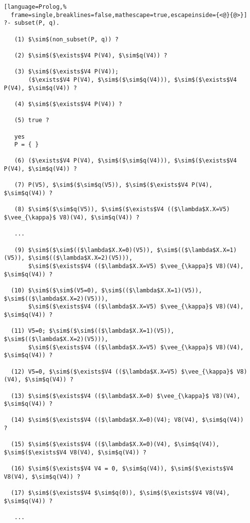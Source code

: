 \documentclass[inscr,ack,preface]{dithesis}
\theoremstyle{definition}
\begin{document}
\begin{lstlisting}[language=Prolog,%
  frame=single,breaklines=false,mathescape=true,escapeinside={<@}{@>}]
?- subset(P, q).

   (1) $\sim$(non_subset(P, q)) ?

   (2) $\sim$($\exists$V4 P(V4), $\sim$q(V4)) ?

   (3) $\sim$($\exists$V4 P(V4));
       ($\exists$V4 P(V4), $\sim$($\sim$q(V4))), $\sim$($\exists$V4 P(V4), $\sim$q(V4)) ?

   (4) $\sim$($\exists$V4 P(V4)) ?

   (5) true ?

   yes
   P = { }

   (6) ($\exists$V4 P(V4), $\sim$($\sim$q(V4))), $\sim$($\exists$V4 P(V4), $\sim$q(V4)) ?

   (7) P(V5), $\sim$($\sim$q(V5)), $\sim$($\exists$V4 P(V4), $\sim$q(V4)) ?

   (8) $\sim$($\sim$q(V5)), $\sim$($\exists$V4 (($\lambda$X.X=V5) $\vee_{\kappa}$ V8)(V4), $\sim$q(V4)) ?

   ...

   (9) $\sim$($\sim$(($\lambda$X.X=0)(V5)), $\sim$(($\lambda$X.X=1)(V5)), $\sim$(($\lambda$X.X=2)(V5))),
       $\sim$($\exists$V4 (($\lambda$X.X=V5) $\vee_{\kappa}$ V8)(V4), $\sim$q(V4)) ?

  (10) $\sim$($\sim$(V5=0), $\sim$(($\lambda$X.X=1)(V5)), $\sim$(($\lambda$X.X=2)(V5))),
       $\sim$($\exists$V4 (($\lambda$X.X=V5) $\vee_{\kappa}$ V8)(V4), $\sim$q(V4)) ?

  (11) V5=0; $\sim$($\sim$(($\lambda$X.X=1)(V5)), $\sim$(($\lambda$X.X=2)(V5))),
       $\sim$($\exists$V4 (($\lambda$X.X=V5) $\vee_{\kappa}$ V8)(V4), $\sim$q(V4)) ?

  (12) V5=0, $\sim$($\exists$V4 (($\lambda$X.X=V5) $\vee_{\kappa}$ V8)(V4), $\sim$q(V4)) ?

  (13) $\sim$($\exists$V4 (($\lambda$X.X=0) $\vee_{\kappa}$ V8)(V4), $\sim$q(V4)) ?

  (14) $\sim$($\exists$V4 (($\lambda$X.X=0)(V4); V8(V4), $\sim$q(V4)) ?

  (15) $\sim$($\exists$V4 (($\lambda$X.X=0)(V4), $\sim$q(V4)), $\sim$($\exists$V4 V8(V4), $\sim$q(V4)) ?

  (16) $\sim$($\exists$V4 V4 = 0, $\sim$q(V4)), $\sim$($\exists$V4 V8(V4), $\sim$q(V4)) ?

  (17) $\sim$($\exists$V4 $\sim$q(0)), $\sim$($\exists$V4 V8(V4), $\sim$q(V4)) ?

   ...


\end{lstlisting}
\end{document}

